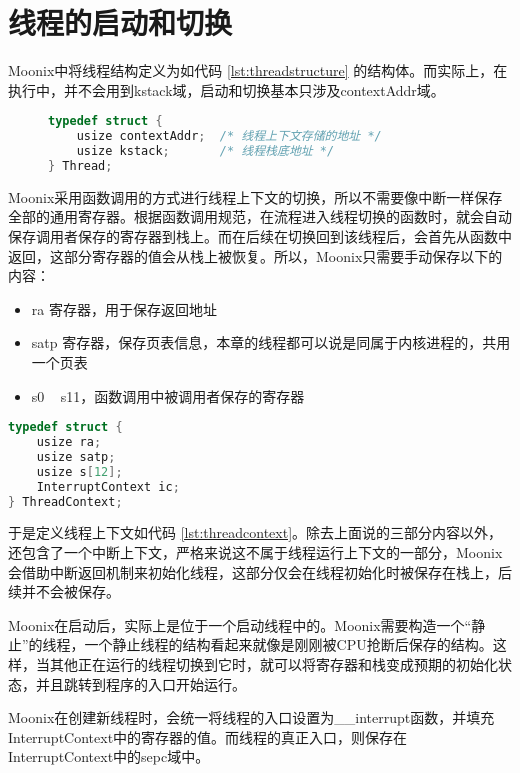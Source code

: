 \section{线程的启动和切换}

Moonix中将线程结构定义为如代码 \ref{lst:threadstructure} 的结构体。而实际上，在执行中，并不会用到kstack域，启动和切换基本只涉及contextAddr域。

\begin{figure}
\begin{lstlisting}[language={C}, caption={线程结构定义}, label={lst:threadstructure}]
typedef struct {
	usize contextAddr;  /* 线程上下文存储的地址 */
	usize kstack;       /* 线程栈底地址 */
} Thread;
\end{lstlisting}
\end{figure}

Moonix采用函数调用的方式进行线程上下文的切换，所以不需要像中断一样保存全部的通用寄存器。根据函数调用规范，在流程进入线程切换的函数时，就会自动保存调用者保存的寄存器到栈上。而在后续在切换回到该线程后，会首先从函数中返回，这部分寄存器的值会从栈上被恢复。所以，Moonix只需要手动保存以下的内容：

\begin{itemize}
	\item ra 寄存器，用于保存返回地址
	\item satp 寄存器，保存页表信息，本章的线程都可以说是同属于内核进程的，共用一个页表
	\item s0 ~ s11，函数调用中被调用者保存的寄存器
\end{itemize}

\begin{lstlisting}[language={C}, caption={线程上下文定义}, label={lst:threadcontext}]
typedef struct {
	usize ra;
	usize satp;
	usize s[12];
	InterruptContext ic;
} ThreadContext;
\end{lstlisting}

于是定义线程上下文如代码 \ref{lst:threadcontext}。除去上面说的三部分内容以外，还包含了一个中断上下文，严格来说这不属于线程运行上下文的一部分，Moonix会借助中断返回机制来初始化线程，这部分仅会在线程初始化时被保存在栈上，后续并不会被保存。

Moonix在启动后，实际上是位于一个启动线程中的。Moonix需要构造一个“静止”的线程，一个静止线程的结构看起来就像是刚刚被CPU抢断后保存的结构。这样，当其他正在运行的线程切换到它时，就可以将寄存器和栈变成预期的初始化状态，并且跳转到程序的入口开始运行。

Moonix在创建新线程时，会统一将线程的入口设置为\_\_interrupt函数，并填充InterruptContext中的寄存器的值。而线程的真正入口，则保存在InterruptContext中的sepc域中。

